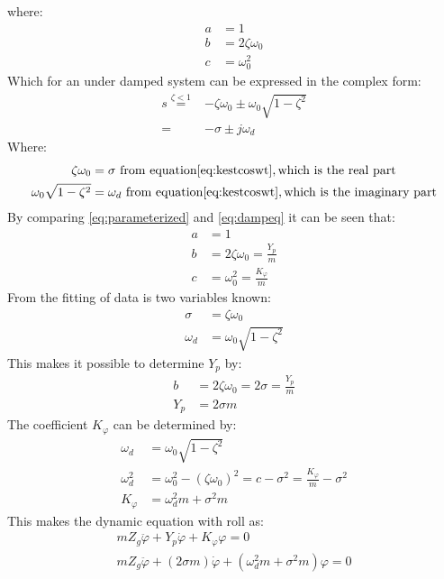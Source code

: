 where:
\begin{align}
a &= 1\\
b &= 2\zeta \omega_0\\
c &= \omega_0^2
\end{align}
Which for an under damped system can be expressed in the complex form:
\begin{align}
s \stackrel{\zeta < 1}{=} &-\zeta\omega_0\pm\omega_0\sqrt{1-\zeta^2}\\
= &-\sigma\pm j\omega_d
\end{align}
Where:
\begin{align}
\zeta\omega_0 &= \sigma\ \text{from equation} \ref{eq:kestcoswt}, \text{which is the real part}\\
\omega_0\sqrt{1-\zeta^2} &= \omega_d\ \text{from equation} \ref{eq:kestcoswt}, \text{which is the imaginary part}
\end{align}
By comparing \ref{eq:parameterized} and \ref{eq:dampeq} it can be seen that:
\begin{align}
a &= 1\\
b &= 2\zeta\omega_0 = \frac{Y_p}{m}\\
c &= \omega_0^2 = \frac{K_\varphi}{m}
\end{align}
From the fitting of data is two variables known:
\begin{align}
\sigma &= \zeta\omega_0\\
\omega_d&=\omega_0\sqrt{1-\zeta^2}
\end{align}
This makes it possible to determine $Y_p$ by:
\begin{align}
b &= 2\zeta\omega_0 = 2\sigma = \frac{Y_p}{m}\\
Y_p &= 2\sigma m
\end{align}
The coefficient $K_\varphi$ can be determined by: 
\begin{align}
\omega_d &= \omega_0\sqrt{1-\zeta^2}\\
\omega_d^2 &= \omega_0^2-(\zeta\omega_0)^2 = c - \sigma^2 = \frac{K_\varphi}{m}-\sigma^2\\
K_\varphi &= \omega_d^2m+\sigma^2m
\end{align}
This makes the dynamic equation with roll as:
\begin{align}
mZ_g\ddot \varphi + Y_p\dot \varphi + K_\varphi\varphi = 0\\
mZ_g\ddot \varphi + (2\sigma m)\dot \varphi + (\omega_d^2m+\sigma^2m)\varphi = 0
\label{eq:solveddyneq}
\end{align}



